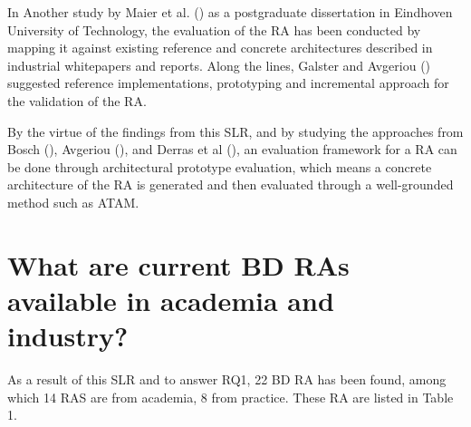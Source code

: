\documentclass{ieeeaccess}
\begin{document}
In Another study by Maier et al. (\cite{Maier}) as a postgraduate dissertation in Eindhoven University of Technology, the evaluation of the RA has been conducted by mapping it against existing reference and concrete architectures described in industrial whitepapers and reports. Along the lines, Galster and Avgeriou (\cite{galster2011empirically}) suggested reference implementations, prototyping and incremental approach for the validation of the RA.

By the virtue of the findings from this SLR, and by studying the approaches from Bosch (\cite{bosch2000design}), Avgeriou (\cite{avgeriou2003describing}), and Derras et al (\cite{derras2018reference}), an evaluation framework for a RA can be done through architectural prototype evaluation, which means a concrete architecture of the RA is generated and then evaluated through a well-grounded method such as ATAM.

\section{What are current BD RAs available in academia and industry?}

As a result of this SLR and to answer RQ1, 22 BD RA has been found, among which 14 RAS are from academia, 8 from practice. These RA are listed in Table 1.
\end{document}
